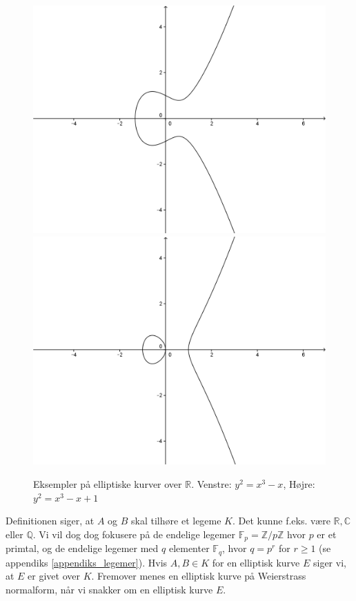 \begin{figure}
\label{figure_elliptic_curves}
\centering
\includegraphics[scale=0.2]{elliptic_1}
\includegraphics[scale=0.2]{elliptic_2}
\caption{Eksempler på elliptiske kurver over $\mathbb{R}$. Venstre: $y^2 = x^3 - x$, Højre: $y^2 = x^3 -x + 1$}
\end{figure}
Definitionen siger, at $A$ og $B$ skal tilhøre et legeme $K$. Det kunne f.eks. være $\mathbb{R}, \mathbb{C}$ eller $\mathbb{Q}$. Vi vil dog dog fokusere på de endelige legemer $\mathbb{F}_p = \mathbb{Z}/p\mathbb{Z}$ hvor $p$ er et primtal, og de endelige legemer med $q$ elementer $\mathbb{F}_q$, hvor $q = p^r$ for $r \geq 1$ (se appendiks \ref{appendiks_legemer}). Hvis $A, B \in K$ for en elliptisk kurve $E$ siger vi, at $E$ er givet over $K$. Fremover menes en elliptisk kurve på Weierstrass normalform, når vi snakker om en elliptisk kurve $E$. 
